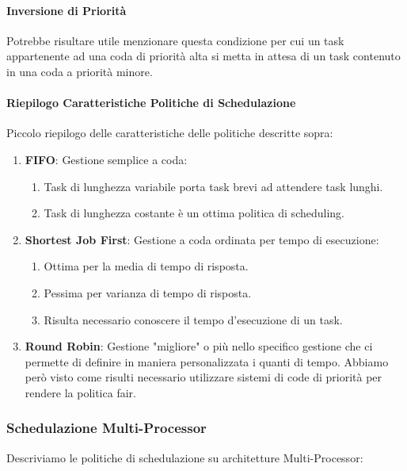 \documentclass{article}
\begin{document}
\newpage

\paragraph{Inversione di Priorità} Potrebbe risultare utile menzionare questa condizione per cui un task appartenente ad una coda di priorità alta si metta in attesa di un task contenuto in una coda
a priorità minore.

\paragraph{Riepilogo Caratteristiche Politiche di Schedulazione} Piccolo riepilogo delle caratteristiche delle politiche descritte sopra:

\begin{enumerate}
    \item \textbf{FIFO}: Gestione semplice a coda:
    \begin{enumerate}
        \item Task di lunghezza variabile porta task brevi ad attendere task lunghi.
        \item Task di lunghezza costante è un ottima politica di scheduling.
    \end{enumerate}
    \item \textbf{Shortest Job First}: Gestione a coda ordinata per tempo di esecuzione:
    \begin{enumerate}
        \item Ottima per la media di tempo di risposta.
        \item Pessima per varianza di tempo di risposta.
        \item Risulta necessario conoscere il tempo d'esecuzione di un task.
    \end{enumerate}
    \item \textbf{Round Robin}: Gestione "migliore" o più nello specifico gestione che ci permette di definire in maniera personalizzata i quanti di tempo. Abbiamo però visto
    come risulti necessario utilizzare sistemi di code di priorità per rendere la politica fair.
\end{enumerate}

\subsubsection{Schedulazione Multi-Processor}

Descriviamo le politiche di schedulazione su architetture Multi-Processor:
\end{document}
